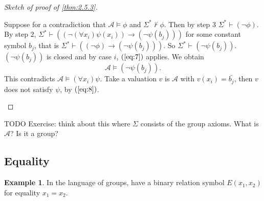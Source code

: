 \documentclass{article}
\newcommand{\rb}[1]{\left( #1 \right)}
\newcommand{\notb}[1]{\rb{\neg #1}}
\newcommand{\impb}[2]{\rb{#1 \rightarrow #2}}
\newcommand{\fab}[1]{\rb{\forall #1}}
\theoremstyle{definition}\newtheorem{definition}{Definition}[subsection]
\theoremstyle{definition}\newtheorem{remark}[definition]{Remark}
\theoremstyle{definition}\newtheorem*{example}{Example}
\theoremstyle{definition}\newtheorem*{note}{Note}
\begin{document}
\begin{proof}[Sketch of proof of \ref{thm:2.5.3}]
\begin{enumerate}
\begin{enumerate}
\begin{enumerate}
\end{enumerate}
\end{enumerate}
Suppose for a contradiction that $ \mathcal{A} \vDash \phi $ and $ \Sigma^* \not\vdash \phi $. Then by step $ 3 $ $ \Sigma^* \vdash \notb{\phi} $. By step $ 2 $, $ \Sigma^* \vdash \impb{\notb{\fab{x_i}\psi\rb{x_i}}}{\notb{\psi\rb{b_j}}} $ for some constant symbol $ b_j $, that is $ \Sigma^* \vdash \impb{\notb{\phi}}{\notb{\psi\rb{b_j}}} $. So $ \Sigma^* \vdash \notb{\psi\rb{b_j}} $. $ \notb{\psi\rb{b_j}} $ is closed and by case $ i $, $ \rb{\ref{eq:7}} $ applies. We obtain
\begin{equation}
\label{eq:8}
\mathcal{A} \vDash \notb{\psi\rb{b_j}}.
\end{equation}
This contradicts $ \mathcal{A} \vDash \fab{x_i}\psi $. Take a valuation $ v $ is $ \mathcal{A} $ with $ v\rb{x_i} = \bar{b_j} $, then $ v $ does not satisfy $ \psi $, by $ \rb{\ref{eq:8}} $.
\end{enumerate}
\end{proof}

TODO Exercise: think about this where $ \Sigma $ consists of the group axioms. What is $ \mathcal{A} $? Is it a group?


\subsection{Equality}

\begin{example}
In the language of groups, have a binary relation symbol $ E\rb{x_1, x_2} $ for equality $ x_1 = x_2 $.
\end{example}
\end{document}
